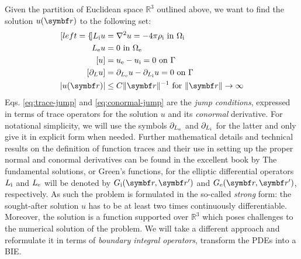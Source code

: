 Given the partition of Euclidean space $\mathbb{R}^3$ outlined above, we
want to
find the solution $u(\vect{r})$ to the following set:
\begin{subequations}\label{eq:transmission}
  \begin{align}[left={\empheqlbrace}]
  \Li u &= \nabla^2 u = -4\pi\rhoi \,\, \text{in}\,\, \Omegai \label{eq:internal} \\
  \Le u &= 0 \,\, \text{in}\,\, \Omegae \label{eq:external} \\
  [u] &= \ue - \ui = 0 \,\, \text{on}\,\, \Gamma
  \label{eq:trace-jump} \\
[\partial_L u] &= \partiale u - \partiali u = 0 \,\, \text{on}\,\, \Gamma \label{eq:conormal-jump} \\
|u(\vect{r})| &\leq C \|\vect{r} \|^{-1} \,\,\text{for}\,\,\| \vect{r} \|\rightarrow\infty
\label{eq:radiation}
\end{align}
\end{subequations}
Eqs. \eqref{eq:trace-jump} and \eqref{eq:conormal-jump}
are the \emph{jump conditions}, expressed in terms of trace operators
for the solution $u$ and its \emph{conormal} derivative.
For notational simplicity, we will use the symbols $\partial_{L_\mathrm{e}}$ and $\partial_{L_\mathrm{i}}$
for the latter and only give it in explicit form when needed.
Further mathematical details and technical results on the definition of
function traces and their use in setting up the proper normal and
conormal derivatives can be found in the excellent book by
\citeauthor{Sauter2011-an}\autocite{Sauter2011-an}
The fundamental solutions, or Green's functions, for the elliptic
differential operators $L_\mathrm{i}$ and $L_\mathrm{e}$ will be denoted by $\Gi$ and
$\Ge$, respectively.
As such the problem is formulated in the so-called \emph{strong} form:
the sought-after solution $u$ has to be at least two times continuously
differentiable.
Moreover, the solution is a function supported over $\mathbb{R}^3$ which
poses challenges to the numerical solution of the problem.
We will take a different approach and reformulate it in terms of
\emph{boundary integral operators}, \ie transform the \acsp{PDE} into a
\gls{BIE}.

